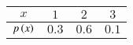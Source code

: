 \begin{tabular}{|c|c|c|c|}
\hline
\textbf{$x$} & $1$ & $2$ & $3$ \\
\hline
\textbf{$p\left(x\right)$} & $0.3$ & $0.6$ &$0.1$\\
\hline
\end{tabular}